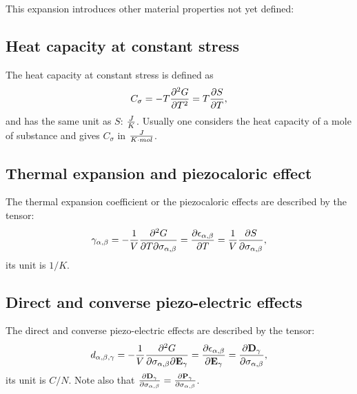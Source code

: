 \documentclass[12pt,a4paper]{article}
\begin{document}
This expansion introduces other material properties not yet defined:
\subsection{Heat capacity at constant stress}
The heat capacity at constant stress is defined as
\begin{equation}
C_\sigma= - T {\partial^2 G \over \partial T^2} = 
T {\partial S \over \partial T},
\end{equation}
and has the same unit as $S$: $J\over K$. Usually one considers the heat
capacity of a mole of substance and gives $C_\sigma$ in 
${J \over K \cdot mol}$.

\subsection{Thermal expansion and piezocaloric effect}
The thermal expansion coefficient or the piezocaloric effects are
described by the tensor:
\begin{equation}
\gamma_{\alpha,\beta}=-{1\over V} {\partial^2 G \over \partial T 
\partial \sigma_{\alpha,\beta}}={\partial \epsilon_{\alpha,\beta} \over 
\partial T}= {1\over V}
{\partial S \over \partial \sigma_{\alpha,\beta}},
\end{equation}
its unit is $1/K$.

\subsection{Direct and converse piezo-electric effects}
The direct and converse piezo-electric effects are described by the 
tensor:
\begin{equation}
d_{\alpha,\beta,\gamma}=-{1\over V} {\partial^2 G \over
\partial \sigma_{\alpha,\beta} \partial {\bf E}_\gamma}=
{\partial \epsilon_{\alpha,\beta} \over \partial {\bf E}_\gamma}= 
{\partial {\bf D}_\gamma \over \partial \sigma_{\alpha,\beta}},
\end{equation}
its unit is $C/N$. Note also that 
${\partial {\bf D}_\gamma \over \partial \sigma_{\alpha,\beta}}
={\partial {\bf P}_\gamma \over \partial \sigma_{\alpha,\beta}}$.
\end{document}
